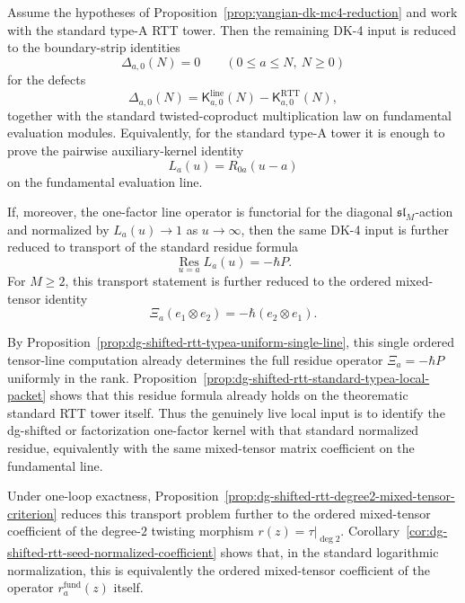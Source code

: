 \begin{proposition}
\label{prop:yangian-dk4-typea-frontier}
Assume the hypotheses of
Proposition~\ref{prop:yangian-dk-mc4-reduction} and work with the
standard type-A RTT tower.  Then the remaining DK-4 input is reduced to
the boundary-strip identities
\[
\Delta_{a,0}(N)=0
\qquad (0\le a\le N,\ N\ge 0)
\]
for the defects
\[
\Delta_{a,0}(N)
=\mathsf{K}^{\mathrm{line}}_{a,0}(N)
-\mathsf{K}^{\mathrm{RTT}}_{a,0}(N),
\]
together with the standard twisted-coproduct multiplication law on
fundamental evaluation modules.  Equivalently, for the standard type-A
tower it is enough to prove the pairwise auxiliary-kernel identity
\[
L_a(u)=R_{0a}(u-a)
\]
on the fundamental evaluation line.

If, moreover, the one-factor line operator is functorial for the
diagonal $\mathfrak{sl}_M$-action and normalized by
$L_a(u)\to 1$ as $u\to\infty$, then the same DK-4 input is further
reduced to transport of the standard residue formula
\[
\operatorname*{Res}_{u=a}L_a(u)=-\hbar P.
\]
For $M\ge 2$, this transport statement is further reduced to the
ordered mixed-tensor
identity
\[
\Xi_a(e_1\otimes e_2)=-\hbar(e_2\otimes e_1).
\]

By
Proposition~\ref{prop:dg-shifted-rtt-typea-uniform-single-line},
this single ordered tensor-line computation already determines the full
residue operator $\Xi_a=-\hbar P$ uniformly in the rank.
Proposition~\ref{prop:dg-shifted-rtt-standard-typea-local-packet}
shows that this residue formula already holds on the theorematic
standard RTT tower itself.  Thus the genuinely live local input is to
identify the dg-shifted or factorization one-factor kernel with that
standard normalized residue, equivalently with the same mixed-tensor
matrix coefficient on the fundamental line.

Under one-loop exactness,
Proposition~\ref{prop:dg-shifted-rtt-degree2-mixed-tensor-criterion}
reduces this transport problem further to the ordered mixed-tensor
coefficient of the degree-$2$ twisting morphism $r(z)=\tau|_{\deg 2}$.
Corollary~\ref{cor:dg-shifted-rtt-seed-normalized-coefficient}
shows that, in the standard logarithmic normalization, this is
equivalently the ordered mixed-tensor coefficient of the operator
$r_a^{\mathrm{fund}}(z)$ itself.


\end{proposition}
